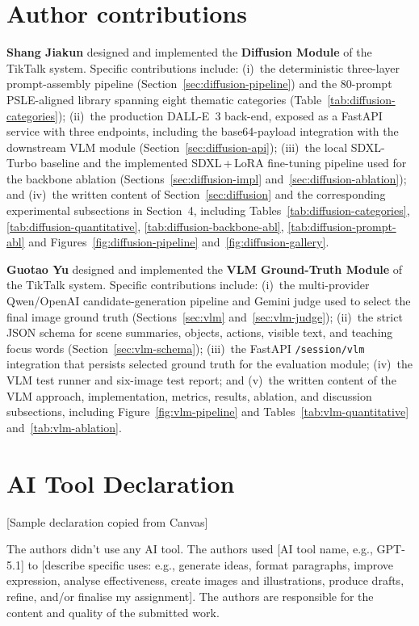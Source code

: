\documentclass{article}
\begin{document}
\section{Author contributions}
\noindent\textbf{Shang Jiakun} designed and implemented the   \textbf{Diffusion Module} of the TikTalk system. Specific contributions   include: (i)~the deterministic three-layer prompt-assembly pipeline   (Section~\ref{sec:diffusion-pipeline}) and the 80-prompt   PSLE-aligned library spanning eight thematic categories   (Table~\ref{tab:diffusion-categories}); (ii)~the production DALL-E~3   back-end, exposed as a FastAPI service with three endpoints, including   the base64-payload integration with the downstream VLM module   (Section~\ref{sec:diffusion-api}); (iii)~the local SDXL-Turbo baseline   and the implemented SDXL\,+\,LoRA fine-tuning pipeline used for the   backbone ablation (Sections~\ref{sec:diffusion-impl}   and~\ref{sec:diffusion-ablation}); and (iv)~the written content of   Section~\ref{sec:diffusion} and the corresponding experimental   subsections in Section~4, including   Tables~\ref{tab:diffusion-categories}, \ref{tab:diffusion-quantitative},   \ref{tab:diffusion-backbone-abl}, \ref{tab:diffusion-prompt-abl} and   Figures~\ref{fig:diffusion-pipeline} and~\ref{fig:diffusion-gallery}.

\noindent\textbf{Guotao Yu} designed and implemented the \textbf{VLM
Ground-Truth Module} of the TikTalk system. Specific contributions
include: (i)~the multi-provider Qwen/OpenAI candidate-generation
pipeline and Gemini judge used to select the final image ground truth
(Sections~\ref{sec:vlm} and~\ref{sec:vlm-judge}); (ii)~the strict JSON
schema for scene summaries, objects, actions, visible text, and teaching
focus words (Section~\ref{sec:vlm-schema}); (iii)~the FastAPI
\texttt{/session/vlm} integration that persists selected ground truth
for the evaluation module; (iv)~the VLM test runner and six-image test
report; and (v)~the written content of the VLM approach, implementation,
metrics, results, ablation, and discussion subsections, including
Figure~\ref{fig:vlm-pipeline} and Tables~\ref{tab:vlm-quantitative}
and~\ref{tab:vlm-ablation}.

\section{AI Tool Declaration}

[Sample declaration copied from Canvas]

The authors didn't use any AI tool. The authors used [AI tool name, e.g., GPT-5.1] to [describe specific uses: e.g., generate ideas, format paragraphs, improve expression, analyse effectiveness, create images and illustrations, produce drafts, refine, and/or finalise my assignment]. The authors are responsible for the content and quality of the submitted work.



\end{document}
